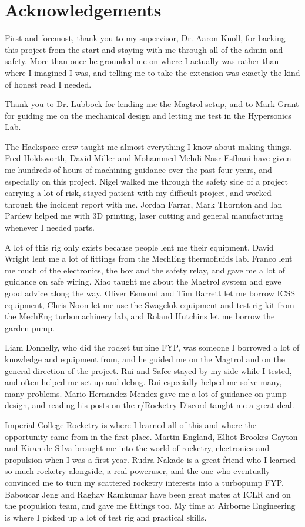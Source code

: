 \section*{Acknowledgements}

First and foremost, thank you to my supervisor, Dr. Aaron Knoll, for backing this project from the start and staying with me through all of the admin and safety. More than once he grounded me on where I actually was rather than where I imagined I was, and telling me to take the extension was exactly the kind of honest read I needed.

Thank you to Dr. Lubbock for lending me the Magtrol setup, and to Mark Grant for guiding me on the mechanical design and letting me test in the Hypersonics Lab.

The Hackspace crew taught me almost everything I know about making things. Fred Holdsworth, David Miller and Mohammed Mehdi Nasr Esfhani have given me hundreds of hours of machining guidance over the past four years, and especially on this project. Nigel walked me through the safety side of a project carrying a lot of risk, stayed patient with my difficult project, and worked through the incident report with me. Jordan Farrar, Mark Thornton and Ian Pardew helped me with 3D printing, laser cutting and general manufacturing whenever I needed parts.

A lot of this rig only exists because people lent me their equipment. David Wright lent me a lot of fittings from the MechEng thermofluids lab. Franco lent me much of the electronics, the box and the safety relay, and gave me a lot of guidance on safe wiring. Xiao taught me about the Magtrol system and gave good advice along the way. Oliver Esmond and Tim Barrett let me borrow ICSS equipment, Chris Noon let me use the Swagelok equipment and test rig kit from the MechEng turbomachinery lab, and Roland Hutchins let me borrow the garden pump.

Liam Donnelly, who did the rocket turbine FYP, was someone I borrowed a lot of knowledge and equipment from, and he guided me on the Magtrol and on the general direction of the project. Rui and Safee stayed by my side while I tested, and often helped me set up and debug. Rui especially helped me solve many, many problems. Mario Hernandez Mendez gave me a lot of guidance on pump design, and reading his posts on the r/Rocketry Discord taught me a great deal.

Imperial College Rocketry is where I learned all of this and where the opportunity came from in the first place. Martin England, Elliot Brookes Gayton and Kiran de Silva brought me into the world of rocketry, electronics and propulsion when I was a first year. Rudra Nakade is a great friend who I learned so much rocketry alongside, a real poweruser, and the one who eventually convinced me to turn my scattered rocketry interests into a turbopump FYP. Baboucar Jeng and Raghav Ramkumar have been great mates at ICLR and on the propulsion team, and gave me fittings too. My time at Airborne Engineering is where I picked up a lot of test rig and practical skills.

